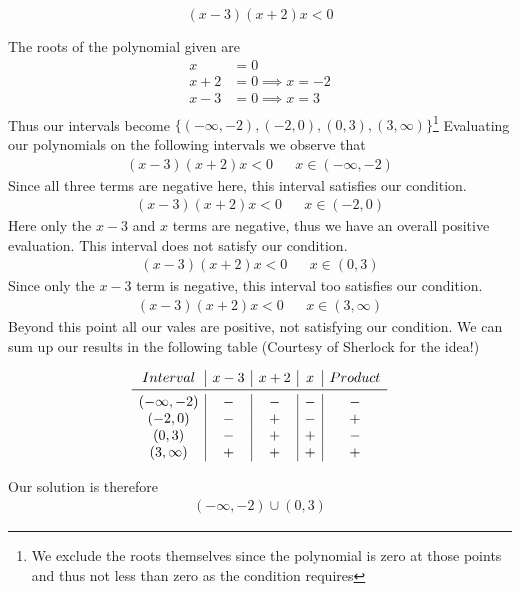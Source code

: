 \documentclass[a4paper]{article}
\begin{document}
\begin{question}{}{}
\[
(x-3)(x+2)x < 0
\]
\end{question}
The roots of the polynomial given are
\begin{align*}
x &= 0 \\
x+2 &= 0 \implies x = -2 \\
x-3 &= 0 \implies x = 3 \\
\end{align*}
Thus our intervals become \(\{(-\infty, -2), (-2, 0), (0, 3), (3, \infty)\}\)\footnote{We exclude the roots themselves since the polynomial is zero at those points and thus not less than zero as the condition requires}
Evaluating our polynomials on the following intervals we observe that
\begin{align*}
(x-3)(x+2)x < 0 &&x \in (-\infty, -2)
\end{align*}
Since all three terms are negative here, this interval satisfies our condition.
\begin{align*}
(x-3)(x+2)x < 0 &&x \in (-2, 0)
\end{align*}
Here only the \(x-3\) and \(x\) terms are negative, thus we have an overall positive evaluation. This interval does not satisfy our condition.
\begin{align*}
(x-3)(x+2)x < 0 &&x \in (0, 3)
\end{align*}
Since only the \(x-3\) term is negative, this interval too satisfies our condition.
\begin{align*}
(x-3)(x+2)x < 0 &&x \in (3, \infty)
\end{align*}
Beyond this point all our vales are positive, not satisfying our condition.
We can sum up our results in the following table (Courtesy of Sherlock for the idea!)

\[
\begin{array}{c|c|c|c|c}
Interval& x-3 & x+2 & x & Product \\
\midrule
(-\infty, -2) &- & - & - & - \\
(-2, 0) &- & + & - & + \\
(0,3) &- & + & + & - \\
(3, \infty) &+ & + & + & + 
\end{array}
\]

Our solution is therefore
\begin{align*}
(-\infty, -2) \cup (0, 3)
\end{align*}

\begin{center}
\end{center}
\end{document}
